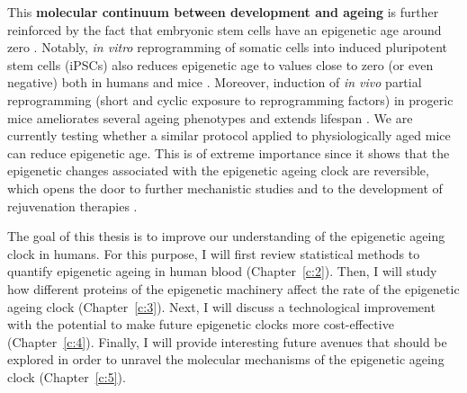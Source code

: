 This \textbf{molecular continuum between development and ageing} is further reinforced by the fact that embryonic stem cells have an epigenetic age around zero \cite{Horvath2013}. Notably, \textit{in vitro} reprogramming of somatic cells into induced pluripotent stem cells (\acrshort{iPSCs}) also reduces epigenetic age to values close to zero (or even negative) both in humans \cite{Horvath2013} and mice \cite{Petkovich2017,Meer2018}. Moreover, induction of \textit{in vivo} partial reprogramming (short and cyclic exposure to reprogramming factors) in progeric mice ameliorates several ageing phenotypes and extends lifespan \cite{Ocampo2016}. We are currently testing whether a similar protocol applied to physiologically aged mice can reduce epigenetic age. This is of extreme importance since it shows that the epigenetic changes associated with the epigenetic ageing clock are reversible, which opens the door to further mechanistic studies and to the development of rejuvenation therapies \cite{Rando2012,Olova2019,Mahmoudi2019,Sarkar2019}.

\bigskip

The goal of this thesis is to improve our understanding of the epigenetic ageing clock in humans. For this purpose, I will first review statistical methods to quantify epigenetic ageing in human blood (Chapter~\ref{c:2}). Then, I will study how different proteins of the epigenetic machinery affect the rate of the epigenetic ageing clock (Chapter~\ref{c:3}). Next, I will discuss a technological improvement with the potential to make future epigenetic clocks more cost-effective (Chapter~\ref{c:4}). Finally, I will provide interesting future avenues that should be explored in order to unravel the molecular mechanisms of the epigenetic ageing clock (Chapter~\ref{c:5}). 
